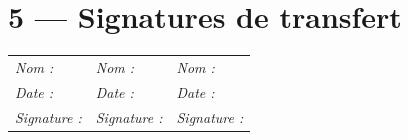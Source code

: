 \documentclass[11pt,a4paper,oneside]{report}
\begin{document}
\section*{5 — Signatures de transfert}

\renewcommand{\arraystretch}{2.5}
\begin{tabularx}{\textwidth}{Y Y Y}
\toprule
{} &  &  \\
\midrule
\textit{Nom :} & \textit{Nom :} & \textit{Nom :} \\
\textit{Date :} & \textit{Date :} & \textit{Date :} \\
\textit{Signature :} & \textit{Signature :} & \textit{Signature :} \\
\bottomrule
\end{tabularx}
\end{document}

